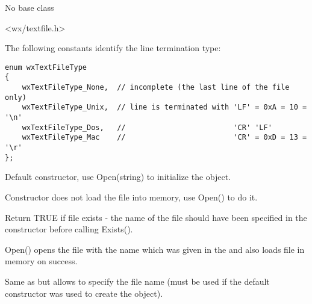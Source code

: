 
No base class


<wx/textfile.h>


The following constants identify the line termination type:

\begin{verbatim}
enum wxTextFileType
{
    wxTextFileType_None,  // incomplete (the last line of the file only)
    wxTextFileType_Unix,  // line is terminated with 'LF' = 0xA = 10 = '\n'
    wxTextFileType_Dos,   //                         'CR' 'LF'
    wxTextFileType_Mac    //                         'CR' = 0xD = 13 = '\r'
};
\end{verbatim}




\label{wxtextfilectordef}


Default constructor, use Open(string) to initialize the object.

\label{wxtextfilector}


Constructor does not load the file into memory, use Open() to do it. 

\label{wxtextfileexists}


Return TRUE if file exists - the name of the file should have been specified
in the constructor before calling Exists().

\label{wxtextfileopen}


Open() opens the file with the name which was given in the  
and also loads file in memory on success.

\label{wxtextfileopenname}


Same as  but allows to specify the file name
(must be used if the default constructor was used to create the object).

